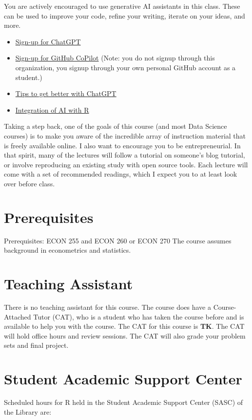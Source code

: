 \documentclass[11pt]{article}
\begin{document}
You are actively encouraged to use generative AI assistants in this class. These can be used to improve your code, refine your writing, iterate on your ideas, and more.

\begin{itemize}
    \item \href{https://chat.openai.com/auth/login}{Sign-up for ChatGPT}
    \item \href{https://docs.github.com/en/copilot/quickstart#signing-up-for-github-copilot-for-your-personal-account}{Sign-up for GitHub CoPilot} (Note: you do not signup through this organization, you signup through your own personal GitHub account as a student.)
    \item \href{https://raw.githack.com/tyleransom/DScourseS23/master/LectureNotes/27-GPT/27slides.html#1}{Tips to get better with ChatGPT}
    \item \href{https://intro2r.library.duke.edu/ai.html}{Integration of AI with R}
\end{itemize}

Taking a step back, one of the goals of this course (and most Data Science courses) is to make you aware of the incredible array of instruction material that is freely available online. I also want to encourage you to be entrepreneurial. In that spirit, many of the lectures will follow a tutorial on someone's blog tutorial, or involve reproducing an existing study with open source tools. Each lecture will come with a set of recommended readings, which I expect you to at least look over before class.

\section*{Prerequisites}
Prerequisites: ECON 255 and ECON 260 or ECON 270 The course assumes background in econometrics and statistics. 

\section*{Teaching Assistant}

There is no teaching assistant for this course. The course does have a Course-Attached Tutor (CAT), who is a student who has taken the course before and is available to help you with the course. The CAT for this course is \textbf{TK}. The CAT will hold office hours and review sessions. The CAT will also grade your problem sets and final project.

\section*{Student Academic Support Center}
Scheduled hours for R held in the Student Academic Support Center (SASC) of the Library are:
\end{document}
